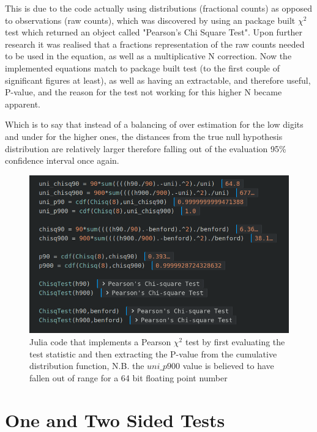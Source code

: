 \documentclass[a4paper,12pt,notitlepage]{article}
\begin{document}
This is due to the code actually using distributions (fractional counts) as opposed to observations (raw counts), which was discovered by using an package built $\chi ^2$ test which returned an object called "Pearson's Chi Square Test". Upon further research it was realised that a fractions representation of the raw counts needed to be used in the equation, as well as a multiplicative N correction. Now the implemented equations match to package built test (to the first couple of significant figures at least), as well as having an extractable, and therefore useful, P-value, and the reason for the test not working for this higher N became apparent. 

Which is to say that instead of a balancing of over estimation for the low digits and under for the higher ones, the distances from the true null hypothesis distribution are relatively larger therefore falling out of the evaluation 95\% confidence interval once again. 

\begin{figure}[h]
\centering
\includegraphics[width=\textwidth]{chisq_code.png}
\caption{Julia code that implements a Pearson $\chi^2$ test by first evaluating the test statistic and then extracting the P-value from the cumulative distribution function, N.B. the $uni\_p900$ value is believed to have fallen out of range for a 64 bit floating point number}
\end{figure}

\section{One and Two Sided Tests}
\end{document}
